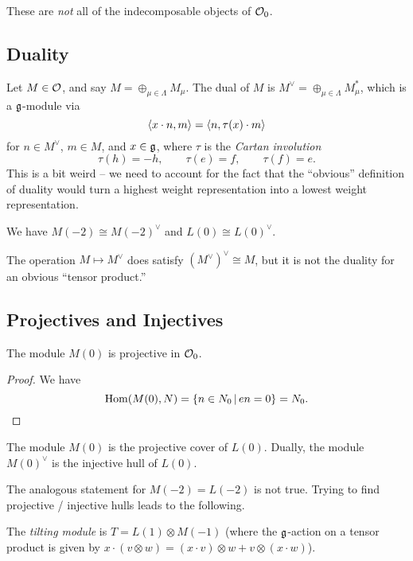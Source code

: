 \documentclass{article}
\begin{document}
These are \emph{not} all of the indecomposable objects of $\mathcal{O}_0$.

\subsection{Duality}

Let $M \in \mathcal{O}$, and say $M = \oplus_{\mu \in \Lambda} M_\mu$.
The dual of $M$ is $M^\vee = \oplus_{\mu \in \Lambda} M_\mu^*$, which is a $\mathfrak{g}$-module via
\[
	\left\langle x \cdot n, m \right\rangle = \left\langle n, \tau(x) \cdot m \right\rangle
\]
for $n \in M^\vee$, $m \in M$, and $x \in \mathfrak{g}$, where $\tau$ is the \emph{Cartan involution}
\[
	\tau(h) = -h, \hspace{2em}
	\tau(e) = f, \hspace{2em}
	\tau(f) = e.
\]
This is a bit weird -- we need to account for the fact that the ``obvious'' definition of duality would turn a highest weight representation into a lowest weight representation.

\begin{ex}
	We have $M(-2) \cong M(-2)^\vee$ and $L(0) \cong L(0)^\vee$.
\end{ex}

The operation $M \mapsto M^\vee$ does satisfy $(M^\vee)^\vee \cong M$, but it is not the duality for an obvious ``tensor product.''

\subsection{Projectives and Injectives}

\begin{prop}
	The module $M(0)$ is projective in $\mathcal{O}_0$.
\end{prop}

\begin{proof}
	We have
	\[
		\operatorname{Hom}(M(0), N) = \{ n \in N_0 \,|\, en = 0 \} = N_0. \qedhere
	\]
\end{proof}

\begin{cor}
	The module $M(0)$ is the projective cover of $L(0)$.
	Dually, the module $M(0)^\vee$ is the injective hull of $L(0)$.
\end{cor}

The analogous statement for $M(-2) = L(-2)$ is not true.
Trying to find projective / injective hulls leads to the following.

\begin{dfn}
	The \emph{tilting module} is $T = L(1) \otimes M(-1)$ (where the $\mathfrak{g}$-action on a tensor product is given by $x \cdot (v \otimes w) = (x \cdot v) \otimes w + v \otimes (x \cdot w)$).
\end{dfn}
\end{document}
